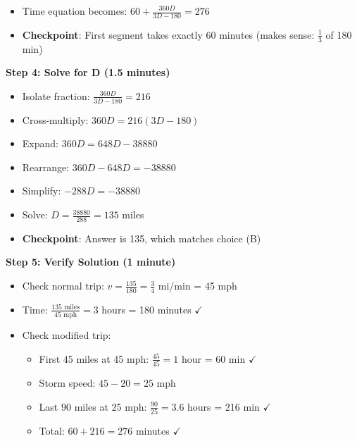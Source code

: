 \documentclass[11pt]{article}
\begin{document}
\begin{roadmapbox}
\begin{itemize}[leftmargin=*]
    \item Time equation becomes: $60 + \frac{360D}{3D - 180} = 276$
    
    \item \textbf{Checkpoint}: First segment takes exactly 60 minutes (makes sense: $\frac{1}{3}$ of 180 min)
\end{itemize}

\textbf{Step 4: Solve for D (1.5 minutes)}
\begin{itemize}[leftmargin=*]
    \item Isolate fraction: $\frac{360D}{3D - 180} = 216$
    
    \item Cross-multiply: $360D = 216(3D - 180)$
    
    \item Expand: $360D = 648D - 38880$
    
    \item Rearrange: $360D - 648D = -38880$
    
    \item Simplify: $-288D = -38880$
    
    \item Solve: $D = \frac{38880}{288} = 135$ miles
    
    \item \textbf{Checkpoint}: Answer is 135, which matches choice (B)
\end{itemize}

\textbf{Step 5: Verify Solution (1 minute)}
\begin{itemize}[leftmargin=*]
    \item Check normal trip: $v = \frac{135}{180} = \frac{3}{4}$ mi/min = 45 mph
    \item Time: $\frac{135 \text{ miles}}{45 \text{ mph}} = 3$ hours = 180 minutes $\checkmark$
    
    \item Check modified trip:
    \begin{itemize}[leftmargin=*]
        \item First $45$ miles at 45 mph: $\frac{45}{45} = 1$ hour = 60 min $\checkmark$
        \item Storm speed: $45 - 20 = 25$ mph
        \item Last $90$ miles at 25 mph: $\frac{90}{25} = 3.6$ hours = 216 min $\checkmark$
        \item Total: $60 + 216 = 276$ minutes $\checkmark$
    \end{itemize}
    

\end{itemize}
\end{roadmapbox}
\end{document}
